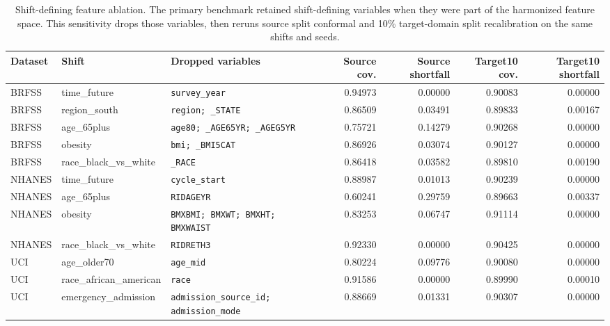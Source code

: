 \begin{table}[!tbp]
\centering
\caption{Shift-defining feature ablation. The primary benchmark retained shift-defining variables when they were part of the harmonized feature space. This sensitivity drops those variables, then reruns source split conformal and 10\% target-domain split recalibration on the same shifts and seeds.}
\label{tab:shift_defining_feature_ablation}
\scriptsize
\setlength{\tabcolsep}{2.5pt}
\renewcommand{\arraystretch}{1.08}
\begin{tabularx}{\textwidth}{@{}L{1.35cm}L{2.55cm}Yrrrr@{}}
\toprule
Dataset & Shift & Dropped variables & Source cov. & Source shortfall & Target10 cov. & Target10 shortfall \\
\midrule
BRFSS & time\_future & \texttt{survey\_year} & 0.94973 & 0.00000 & 0.90083 & 0.00000 \\
BRFSS & region\_south & \texttt{region; \_STATE} & 0.86509 & 0.03491 & 0.89833 & 0.00167 \\
BRFSS & age\_65plus & \texttt{age80; \_AGE65YR; \_AGEG5YR} & 0.75721 & 0.14279 & 0.90268 & 0.00000 \\
BRFSS & obesity & \texttt{bmi; \_BMI5CAT} & 0.86926 & 0.03074 & 0.90127 & 0.00000 \\
BRFSS & race\_black\_vs\_white & \texttt{\_RACE} & 0.86418 & 0.03582 & 0.89810 & 0.00190 \\
NHANES & time\_future & \texttt{cycle\_start} & 0.88987 & 0.01013 & 0.90239 & 0.00000 \\
NHANES & age\_65plus & \texttt{RIDAGEYR} & 0.60241 & 0.29759 & 0.89663 & 0.00337 \\
NHANES & obesity & \texttt{BMXBMI; BMXWT; BMXHT; BMXWAIST} & 0.83253 & 0.06747 & 0.91114 & 0.00000 \\
NHANES & race\_black\_vs\_white & \texttt{RIDRETH3} & 0.92330 & 0.00000 & 0.90425 & 0.00000 \\
UCI & age\_older70 & \texttt{age\_mid} & 0.80224 & 0.09776 & 0.90080 & 0.00000 \\
UCI & race\_african\_american & \texttt{race} & 0.91586 & 0.00000 & 0.89990 & 0.00010 \\
UCI & emergency\_admission & \texttt{admission\_source\_id; admission\_mode} & 0.88669 & 0.01331 & 0.90307 & 0.00000 \\
\bottomrule
\end{tabularx}
\end{table}
